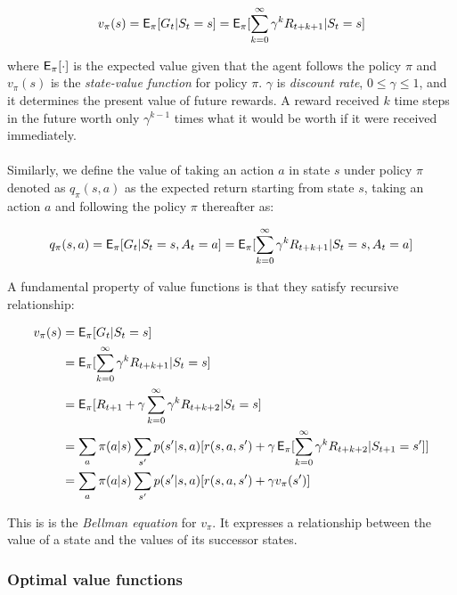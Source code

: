 \documentclass[a4paper]{article}
\begin{document}
\begin{equation}
v_{\pi}(s)=\operatorname{\mathsf{E}}_{\pi}[G_t | S_t = s] = \operatorname{\mathsf{E}}_{\pi}[\sum\limits_{k=0}^{\infty}\gamma^{k}R_{t+k+1}|S_t = s]
\end{equation}

where $\operatorname{\mathsf{E}}_{\pi}[\cdot]$ is the expected value given that the agent follows the policy $\pi$ and $v_{\pi}(s)$ is the \textit{state-value function} for policy $\pi$. $\gamma$ is \textit{discount rate}, $0 \leq \gamma \leq 1$, and it determines the present value of future rewards. A reward received $k$ time steps in the future worth only $\gamma^{k-1}$ times what it would be worth if it were received immediately.  
\\\\
\indent Similarly, we define the value of taking an action $a$ in state $s$ under policy $\pi$ denoted as $q_{\pi}(s,a)$ as the expected return starting from state $s$, taking an action $a$ and following the policy $\pi$ thereafter as:

\begin{equation}
q_{\pi}(s,a)=\operatorname{\mathsf{E}}_{\pi}[G_t | S_t = s, A_t = a] = \operatorname{\mathsf{E}}_{\pi}[\sum\limits_{k=0}^{\infty}\gamma^{k}R_{t+k+1}|S_t = s, A_t=a]
\end{equation}

\indent A fundamental property of value functions is that they satisfy recursive relationship:

\begin{align*}
v_{\pi}(s) &=\operatorname{\mathsf{E}}_{\pi}[G_t | S_t = s] \\
&= \operatorname{\mathsf{E}}_{\pi}[\sum\limits_{k=0}^{\infty}\gamma^{k}R_{t+k+1}|S_t = s] \\
&= \operatorname{\mathsf{E}}_{\pi}[R_{t+1} + \gamma\sum\limits_{k=0}^{\infty}\gamma^{k}R_{t+k+2}|S_t = s] \\
&=  \sum\limits_{a}\pi(a|s)\sum\limits_{s'}p(s'|s,a)[r(s,a,s') + \gamma\operatorname{\mathsf{E}}_{\pi}[\sum\limits_{k=0}^{\infty}\gamma^{k}R_{t+k+2}|S_{t+1} = s'] ]\\
&=  \sum\limits_{a}\pi(a|s)\sum\limits_{s'}p(s'|s,a)[r(s,a,s') + \gamma v_{\pi}(s')]
\end{align*}

This is is the \textit{Bellman equation} for $v_{\pi}$. It expresses a relationship between the value of a state and the values of its successor states.

\subsubsection{Optimal value functions}
\end{document}

